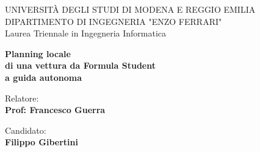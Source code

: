 \begin{titlepage}
\begin{figure}[!htb]
    \centering
\end{figure}
\vspace{30mm}
\begin{center}
    \LARGE{UNIVERSITÀ DEGLI STUDI DI MODENA E REGGIO EMILIA}
    \vspace{5mm}
    \\ \large{DIPARTIMENTO DI INGEGNERIA "ENZO FERRARI"}
    \vspace{5mm}
    \\ Laurea Triennale in Ingegneria Informatica
\end{center}

\vspace{15mm}
\begin{center}
    {\LARGE{\bf Planning locale\\ \vspace{5mm} di una vettura da Formula Student\\ \vspace{5mm} a guida autonoma}}
    
    
\end{center}
\vspace{30mm}

\begin{minipage}[t]{0.47\textwidth}
	{\large{Relatore:}{\normalsize\vspace{3mm}
	\bf\\ \large{Prof: Francesco Guerra}}}
\end{minipage}
\hfill
\begin{minipage}[t]{0.47\textwidth}\raggedleft
	{\large{Candidato:}{\normalsize\vspace{3mm} \bf\\ \large{Filippo Gibertini}}}
\end{minipage}

\vspace{30mm}
\hrulefill
\\

\end{titlepage}